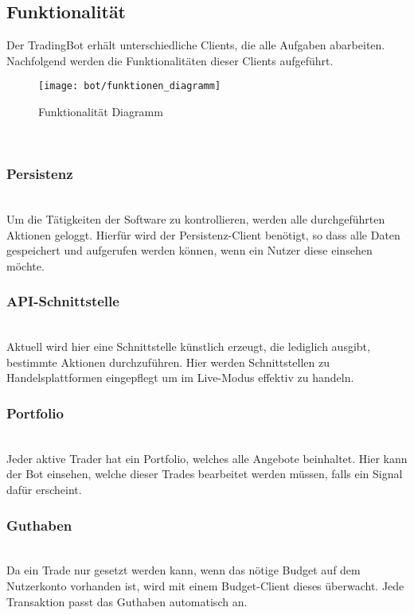 \subsection{Funktionalität}
Der TradingBot erhält unterschiedliche Clients, die alle Aufgaben abarbeiten. Nachfolgend werden die Funktionalitäten dieser Clients aufgeführt.
\begin{figure}[!ht]
\texttt{[image: bot/funktionen\_diagramm]}
\caption{Funktionalität Diagramm}
\label{Funktionalität_Diagramm}
\end{figure}
\\
\subsubsection{Persistenz\nopunct}~\\
Um die Tätigkeiten der Software zu kontrollieren, werden alle durchgeführten Aktionen geloggt. Hierfür wird der Persistenz-Client benötigt, so dass alle Daten gespeichert und aufgerufen werden können, wenn ein Nutzer diese einsehen möchte.
\subsubsection{API-Schnittstelle\nopunct}~\\
Aktuell wird hier eine Schnittstelle künstlich erzeugt, die lediglich ausgibt, bestimmte Aktionen durchzuführen. Hier werden Schnittstellen zu Handelsplattformen eingepflegt um im Live-Modus effektiv zu handeln.
\subsubsection{Portfolio\nopunct}~\\
Jeder aktive Trader hat ein Portfolio, welches alle Angebote beinhaltet. Hier kann der Bot einsehen, welche dieser Trades bearbeitet werden müssen, falls ein Signal dafür erscheint.
\subsubsection{Guthaben\nopunct}~\\
Da ein Trade nur gesetzt werden kann, wenn das nötige Budget auf dem Nutzerkonto vorhanden ist, wird mit einem Budget-Client dieses überwacht. Jede Transaktion passt das Guthaben automatisch an.
